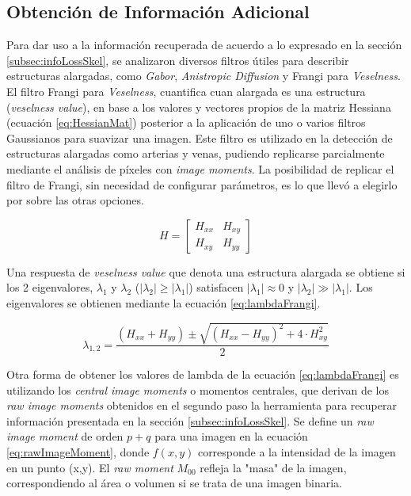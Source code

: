 \subsection{Obtenci\'on de Informaci\'on Adicional}

Para dar uso a la informaci\'on recuperada de acuerdo a lo expresado en la secci\'on \ref{subsec:infoLossSkel}, se analizaron diversos filtros \'utiles para describir estructuras alargadas, como {\it Gabor}, {\it Anistropic Diffusion} y Frangi para {\it Veselness}. El filtro Frangi para {\it Veselness}\cite{frangi1998multiscale}\cite{fu2018frangi}, cuantifica cuan alargada es una estructura ({\it veselness value}), en base a los valores y vectores propios de la matriz Hessiana (ecuaci\'on \eqref{eq:HessianMat}) posterior a la aplicaci\'on de uno o varios filtros Gaussianos para suavizar una imagen. Este filtro es utilizado en la detecci\'on de estructuras alargadas como arterias y venas, pudiendo replicarse parcialmente mediante el an\'alisis de p\'ixeles con {\it image moments}\cite{flusser2009moments}. La posibilidad de replicar el filtro de Frangi, sin necesidad de configurar par\'ametros, es lo que llev\'o a elegirlo por sobre las otras opciones.

\begin{equation}
    \label{eq:HessianMat}
    H = \begin{bmatrix}
        H_{xx} & H_{xy} \\
        H_{xy} & H_{yy} 
        \end{bmatrix}
\end{equation}

Una respuesta de {\it veselness value} que denota una estructura alargada se obtiene si los 2 eigenvalores, $\lambda_1$ y $\lambda_2$ ($|\lambda_2| \geq |\lambda_1|$) satisfacen $|\lambda_1| \approx 0 $ y $|\lambda_2| \gg |\lambda_1|$. Los eigenvalores se obtienen mediante la ecuaci\'on \ref{eq:lambdaFrangi}.

\begin{equation}
    \label{eq:lambdaFrangi}
    \lambda_{1,2} = \dfrac{(H_{xx} + H_{yy}) \pm \sqrt{(H_{xx} - H_{yy})^{2} + 4\cdot H_{xy}^{2}     } }{2}
\end{equation}

Otra forma de obtener los valores de lambda de la ecuaci\'on \ref{eq:lambdaFrangi} es utilizando los {\it central image moments} o momentos centrales, que derivan de los {\it raw image moments} obtenidos en el segundo paso la herramienta para recuperar informaci\'on presentada en la secci\'on \ref{subsec:infoLossSkel}. Se define un {\it raw image moment} de orden $p+q$ para una imagen en la ecuaci\'on \eqref{eq:rawImageMoment}, donde $f(x,y)$ corresponde a la intensidad de la imagen en un punto (x,y). El {\it raw moment} $M_{00}$ refleja la "masa" de la imagen, correspondiendo al \'area o volumen si se trata de una imagen binaria. 

